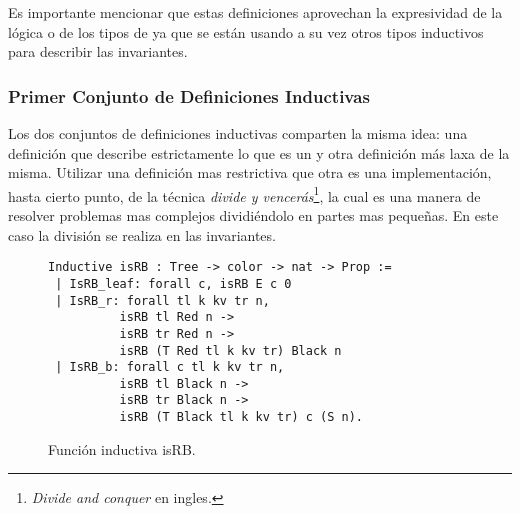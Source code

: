 Es importante mencionar que estas definiciones aprovechan la expresividad de la lógica o de 
los tipos de {\coq} ya que se est\'an usando a su vez otros tipos inductivos para describir las invariantes.

\subsubsection{Primer Conjunto de Definiciones Inductivas}
Los dos conjuntos de definiciones inductivas comparten la misma idea: una definici\'on que describe
estrictamente lo que es un {\arn} y otra definici\'on m\'as laxa de la misma. Utilizar una definici\'on mas restrictiva que otra es una implementaci\'on, hasta cierto punto, de la t\'ecnica \textit{divide y vencerás}\footnote{\textit{Divide and conquer} en ingles.}, la cual es una manera de resolver problemas mas complejos dividiéndolo en partes mas pequeñas. En este caso la división se realiza en las invariantes.

\begin{figure}[!ht]
\centering
\captionsetup{justification=centering}
\begin{verbatim}
Inductive isRB : Tree -> color -> nat -> Prop :=
 | IsRB_leaf: forall c, isRB E c 0
 | IsRB_r: forall tl k kv tr n,
          isRB tl Red n ->
          isRB tr Red n ->
          isRB (T Red tl k kv tr) Black n
 | IsRB_b: forall c tl k kv tr n,
          isRB tl Black n ->
          isRB tr Black n ->
          isRB (T Black tl k kv tr) c (S n).
\end{verbatim}
\caption{Funci\'on inductiva isRB.}
\label{inductive_isRB}
\end{figure}

